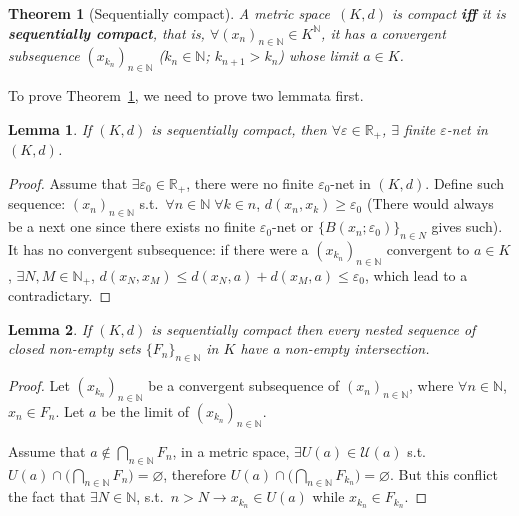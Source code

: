 \documentclass[openany]{book}
\newcommand*{\indexbf}[1]{\emph{\textbf{#1}}\index{#1}} %
\theoremstyle{plain}
\newtheorem{theorem}{Theorem}[section] %
\newtheorem{lemma}{Lemma} %
\theoremstyle{definition}
\newcommand{\emphbf}[1]{\emph{\textbf{#1}}}
\begin{document}
\begin{theorem}[Sequentially compact]\label{theorem: sequentially compact iff compact (metric)}
	A metric space~$(K, d)$ is compact \emphbf{iff} it is \indexbf{sequentially compact}, 
	that is, $\forall (x_n)_{n \in \mathbb N} \in K^\mathbb N$, it has a convergent subsequence $(x_{k_n})_{n \in \mathbb N}$ 
		($k_n \in \mathbb N$; $k_{n+1} > k_n$)
	whose limit $a \in K$.
\end{theorem}

To prove Theorem~\ref{theorem: sequentially compact iff compact (metric)}, we need to prove two lemmata first.

\begin{lemma}\label{lemma: finite e-net exists (metric, sequentially compact)}
	If $(K, d)$ is sequentially compact, then $\forall \varepsilon \in \mathbb R_+$, $\exists$ finite $\varepsilon$-net in $(K, d)$. 
\end{lemma}
\begin{proof}
	Assume that $\exists \varepsilon_0 \in \mathbb R_+$, there were no finite  $\varepsilon_0$-net in $(K, d)$. 
	Define such sequence: $ (x_n)_{n \in \mathbb N}$ s.t.\ $\forall n \in \mathbb N \; \forall k \in n$, $d(x_n, x_k) \geq \varepsilon_0$ 
		(There would always be a next one since there exists no finite $\varepsilon_0$-net or $\{B(x_n; \varepsilon_0)\}_{n \in N}$ gives such). 
		It has no convergent subsequence: 
		if there were a $(x_{k_n})_{n \in \mathbb N}$ convergent to $a\in K$, $\exists N,M\in\mathbb{N}_+$, $d(x_N, x_M)\leq d(x_N, a)+d(x_M, a)\leq \varepsilon_0$, which lead to a contradictary. 
\end{proof}

\begin{lemma}\label{lemma: intersection of closed nested sequence (sequentially compact)}
	If $(K, d)$ is sequentially compact then every nested sequence of closed non-empty sets $\{F_n\}_{n \in \mathbb N}$ in $K$ have a non-empty intersection.
\end{lemma}
\begin{proof}
	Let $(x_{k_n})_{n \in \mathbb N}$ be a convergent subsequence of $(x_n)_{n \in \mathbb N}$, where $\forall n \in \mathbb N$, $x_n \in F_n$. 
	Let $a$ be the limit of $(x_{k_n})_{n \in \mathbb N}$. 

	Assume that $a \notin \bigcap_{n \in \mathbb N} F_n$, in a metric space, $\exists U(a) \in \mathscr U(a)$ s.t.\ $U(a) \cap \big(\bigcap_{n \in \mathbb N} F_n \big) = \varnothing$, therefore $U(a) \cap \big(\bigcap_{n \in \mathbb N} F_{k_n} \big)=\varnothing$. 
	But this conflict the fact that $\exists N \in \mathbb N$, s.t.\ $n > N \to x_{k_n}\in U(a)$ while $x_{k_n} \in F_{k_n}$.
\end{proof}
\end{document}

